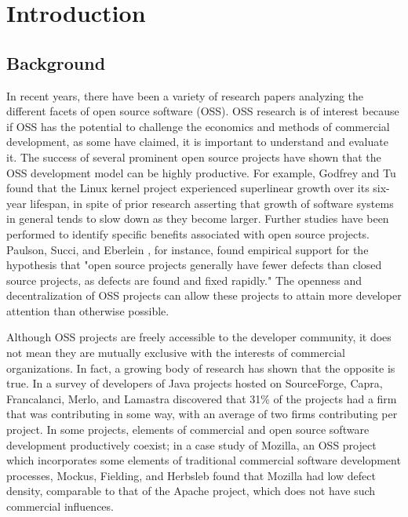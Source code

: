 \chapter{Introduction}
\section{Background}
In recent years, there have been a variety of research papers analyzing the different facets of open source software (OSS). OSS research is of interest because if OSS has the potential to challenge the economics and methods of commercial development, as some have claimed, it is important to understand and evaluate it\cite{mockus2002two}. The success of several prominent open source projects have shown that the OSS development model can be highly productive. For example, Godfrey and Tu \cite{godfrey2000evolution} found that the Linux kernel project experienced superlinear growth over its six-year lifespan, in spite of prior research asserting that growth of software systems in general tends to slow down as they become larger. Further studies have been performed to identify specific benefits associated with open source projects. Paulson, Succi, and Eberlein \cite{paulson2004empirical}, for instance, found empirical support for the hypothesis that "open source projects generally have fewer defects than closed source projects, as defects are found and fixed rapidly." The openness and decentralization of OSS projects can allow these projects to attain more developer attention than otherwise possible.

Although OSS projects are freely accessible to the developer community, it does not mean they are mutually exclusive with the interests of commercial organizations. In fact, a growing body of research has shown that the opposite is true. In a survey of developers of Java projects hosted on SourceForge, Capra, Francalanci, Merlo, and Lamastra discovered that 31\% of the projects had a firm that was contributing in some way, with an average of two firms contributing per project\cite{capra2009survey}. In some projects, elements of commercial and open source software development productively coexist; in a case study of Mozilla, an OSS project which incorporates some elements of traditional commercial software development processes, Mockus, Fielding, and Herbsleb \cite{mockus2002two} found that Mozilla had low defect density, comparable to that of the Apache project, which does not have such commercial influences.

